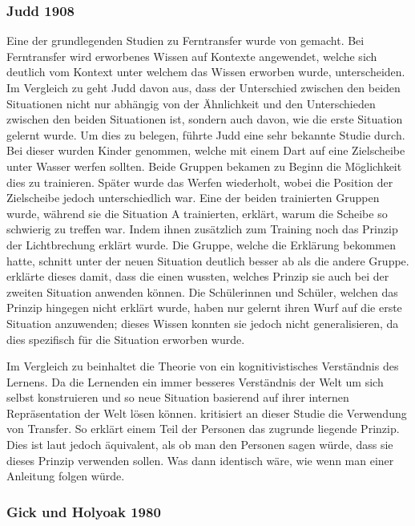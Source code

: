 \subsubsection{Judd 1908}
Eine der grundlegenden Studien zu Ferntransfer wurde von \citet{judd1908} gemacht. Bei Ferntransfer wird erworbenes Wissen auf Kontexte angewendet, welche sich deutlich vom Kontext unter welchem das Wissen erworben wurde, unterscheiden.
Im Vergleich zu \citeauthor{Woodworth1901} geht Judd davon aus, dass der Unterschied zwischen den beiden Situationen nicht nur abhängig von der Ähnlichkeit und den Unterschieden zwischen den beiden Situationen ist, sondern auch davon, wie die erste Situation gelernt wurde. Um dies zu belegen, führte Judd eine sehr bekannte Studie durch. Bei dieser wurden Kinder genommen, welche mit einem Dart auf eine Zielscheibe unter Wasser werfen sollten. Beide Gruppen bekamen zu Beginn die Möglichkeit dies zu trainieren. Später wurde das Werfen wiederholt, wobei die Position der Zielscheibe jedoch unterschiedlich war. Eine der beiden trainierten Gruppen wurde, während sie die Situation A trainierten, erklärt, warum die Scheibe so schwierig zu treffen war. Indem ihnen zusätzlich zum Training noch das Prinzip der Lichtbrechung erklärt wurde. Die Gruppe, welche die Erklärung bekommen hatte, schnitt unter der neuen Situation deutlich besser ab als die andere Gruppe. \citet{judd1908} erklärte dieses damit, dass die einen wussten, welches Prinzip sie auch bei der zweiten Situation anwenden können. Die Schülerinnen und Schüler, welchen das Prinzip hingegen nicht erklärt wurde, haben nur gelernt ihren Wurf auf die erste Situation anzuwenden; dieses Wissen konnten sie jedoch nicht generalisieren, da dies spezifisch für die Situation erworben wurde. 

Im Vergleich zu \citeauthor{Woodworth1901} beinhaltet die Theorie von \citeauthor{judd1908} ein kognitivistisches Verständnis des Lernens. Da die Lernenden ein immer besseres Verständnis der Welt um sich selbst konstruieren und so neue Situation basierend auf ihrer internen Repräsentation der Welt lösen können. \citet{Detterman1993} kritisiert an dieser Studie die Verwendung von Transfer. So erklärt \citeauthor{judd1908} einem Teil der Personen das zugrunde liegende Prinzip. Dies ist laut \citeauthor{Detterman1993} jedoch äquivalent, als ob man den Personen sagen würde, dass sie dieses Prinzip verwenden sollen. Was dann identisch wäre, wie wenn man einer Anleitung folgen würde.

\subsubsection{Gick und Holyoak 1980}

